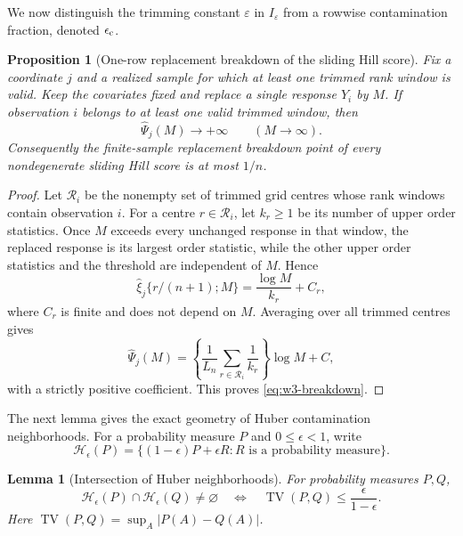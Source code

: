 \documentclass[11pt]{article}
\newtheorem{proposition}[theorem]{Proposition}
\newtheorem{lemma}[theorem]{Lemma}
\theoremstyle{remark}
\newcommand{\I}{I_\varepsilon}
\newcommand{\TV}{\operatorname{TV}}
\begin{document}
We now distinguish the trimming constant $\varepsilon$ in $\I$ from a rowwise
contamination fraction, denoted $\epsilon_{\rm c}$.

\begin{proposition}[One-row replacement breakdown of the sliding Hill score]
\label{prop:w3-breakdown}
Fix a coordinate $j$ and a realized sample for which at least one trimmed rank
window is valid.  Keep the covariates fixed and replace a single response
$Y_i$ by $M$.  If observation $i$ belongs to at least one valid trimmed window,
then
\begin{equation}
 \widehat\Psi_j(M)\longrightarrow+\infty
 \qquad(M\to\infty).
 \label{eq:w3-breakdown}
\end{equation}
Consequently the finite-sample replacement breakdown point of every
nondegenerate sliding Hill score is at most $1/n$.
\end{proposition}

\begin{proof}
Let $\mathcal R_i$ be the nonempty set of trimmed grid centres whose rank
windows contain observation $i$.  For a centre $r\in\mathcal R_i$, let
$k_r\ge1$ be its number of upper order statistics.  Once $M$ exceeds every
unchanged response in that window, the replaced response is its largest order
statistic, while the other upper order statistics and the threshold are
independent of $M$.  Hence
\begin{equation}
 \widehat\xi_j\{r/(n+1);M\}
 =\frac{\log M}{k_r}+C_r,
 \label{eq:w3-local-breakdown}
\end{equation}
where $C_r$ is finite and does not depend on $M$.  Averaging over all trimmed
centres gives
\begin{equation}
 \widehat\Psi_j(M)
 =\left\{\frac1{L_n}\sum_{r\in\mathcal R_i}\frac1{k_r}\right\}
 \log M+C,
 \label{eq:w3-score-breakdown}
\end{equation}
with a strictly positive coefficient.  This proves
\eqref{eq:w3-breakdown}.
\end{proof}

The next lemma gives the exact geometry of Huber contamination neighborhoods.
For a probability measure $P$ and $0\le\epsilon<1$, write
\begin{equation}
 \mathcal H_\epsilon(P)
 =\{(1-\epsilon)P+\epsilon R:R\text{ is a probability measure}\}.
 \label{eq:w3-huber-neighborhood}
\end{equation}

\begin{lemma}[Intersection of Huber neighborhoods]
\label{lem:w3-huber-intersection}
For probability measures $P,Q$,
\begin{equation}
 \mathcal H_\epsilon(P)\cap\mathcal H_\epsilon(Q)\ne\varnothing
 \quad\Longleftrightarrow\quad
 \TV(P,Q)\le\frac{\epsilon}{1-\epsilon}.
 \label{eq:w3-huber-intersection}
\end{equation}
Here $\TV(P,Q)=\sup_A|P(A)-Q(A)|$.
\end{lemma}
\end{document}

